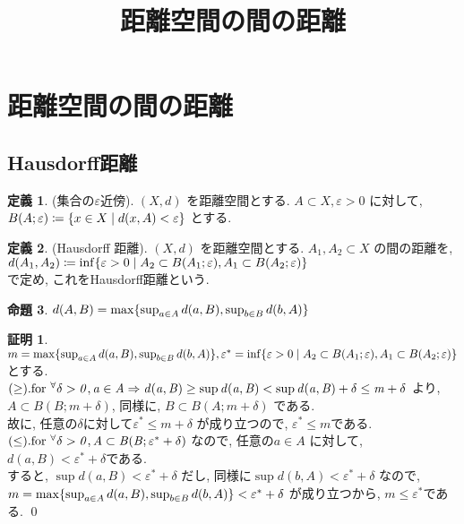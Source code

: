 \documentclass[10pt, fleqn, label-section=none]{bxjsarticle}
\title{距離空間の間の距離}
\author{}
\date{}
\theoremstyle{definition}
\newtheorem{dfn}{定義}[section]
\newtheorem{prop}[dfn]{命題}
\newtheorem*{pf*}{証明}
\newcommand{\forany}{\rm{for} \ {}^{\forall}}
\newcommand{\veps}{\varepsilon}
\newcommand{\cbra}[1]{\mleft\{#1\mright\}}
\newcommand{\naraba}{\Rightarrow}
\begin{document}
\maketitle
\scriptsize 








\section{距離空間の間の距離}
\subsection{Hausdorff距離}
\begin{dfn}(集合の$\veps$近傍).
$(X,d)$ を距離空間とする. $A\subset X, \veps > 0$ に対して, \\
$B(A;\veps ) \coloneqq \cbra{x \in X \mid d(x, A) < \veps}$ とする.
\end{dfn}

\begin{dfn}(Hausdorff 距離).
$(X,d)$ を距離空間とする. $A_1, A_2  \subset X$ の間の距離を, \\
$d(A_1, A_2) \coloneqq \inf\cbra{\veps > 0 \mid A_2 \subset B(A_1 ; \veps ), A_1 \subset B(A_2 ; \veps) }$\\
で定め, これをHausdorff距離という.
\end{dfn}

\begin{prop}
$d(A,B) = \max \cbra{\sup_{a\in A} d(a,B) , \sup_{b \in B} d(b ,A) }$
\end{prop}
\begin{pf*}
$m = \max \cbra{\sup_{a\in A} d(a,B) , \sup_{b \in B} d(b ,A) }, \veps^* = \inf\cbra{\veps > 0 \mid A_2 \subset B(A_1 ; \veps ), A_1 \subset B(A_2 ; \veps) }$ とする. \\
$(\geq). \forany \it \delta >0 , a \in A \naraba d(a,B) \geq \sup d(a,B) < \sup d(a,B) + \delta \leq m + \delta $ より, $A \subset B(B;m+\delta)$, 同様に, $B \subset B(A;m+\delta)$ である. \\
故に, 任意の$\delta$に対して$\veps^* \leq m + \delta$ が成り立つので, $\veps^* \leq m$である. \\
$(\leq). \forany \it \delta >0, A \subset B(B; \veps^* + \delta)  $ なので, 任意の$a\in A$ に対して, $d(a,B) < \veps^* + \delta$である. \\
すると, $\sup d(a,B) < \veps^* + \delta$ だし, 同様に$\sup d(b,A) < \veps^* + \delta$ なので, \\
$m = \max \cbra{\sup_{a\in A} d(a,B) , \sup_{b \in B} d(b ,A) } < \veps^* + \delta$ が成り立つから, $m \leq \veps^*$である.
\qed
\end{pf*}
\end{document}
